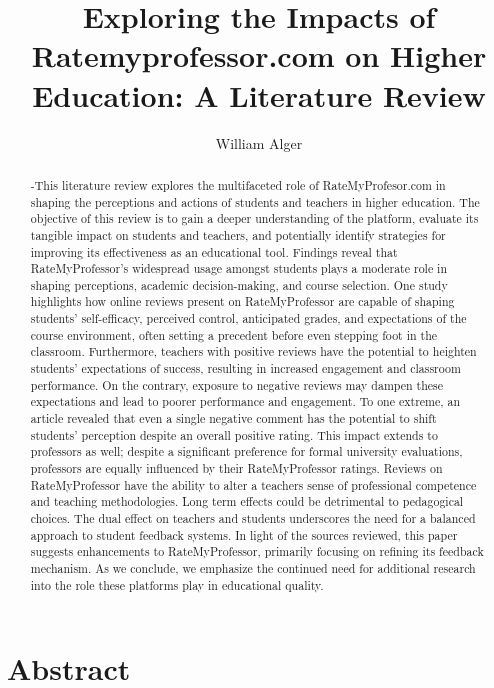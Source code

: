 \documentclass[man, 12pt]{apa7}
\title{Exploring the Impacts of Ratemyprofessor.com on Higher Education: A Literature Review}
\author{William Alger}
\affiliation{Northern Kentucky University}
\begin{document}
\maketitle

\section{Abstract}
\begin{abstract}
-This literature review explores the multifaceted role of RateMyProfesor.com in shaping the perceptions and actions of students and teachers in higher education. 
The objective of this review is to gain a deeper understanding of the platform, evaluate its tangible impact on students and teachers, and potentially identify strategies for improving its effectiveness as an educational tool. Findings reveal that RateMyProfessor's widespread usage amongst students plays a moderate role in shaping perceptions, academic decision-making, and course selection. One study highlights how online reviews present on RateMyProfessor are capable of shaping students' self-efficacy, perceived control, anticipated grades, and expectations of the course environment, often setting a precedent before even stepping foot in the classroom. Furthermore, teachers with positive reviews have the potential to heighten students' expectations of success, resulting in increased engagement and classroom performance. On the contrary, exposure to negative reviews may dampen these expectations and lead to poorer performance and engagement. To one extreme, an article revealed that even a single negative comment has the potential to shift students' perception despite an overall positive rating. This impact extends to professors as well; despite a significant preference for formal university evaluations, professors are equally influenced by their RateMyProfessor ratings. Reviews on RateMyProfessor have the ability to alter a teachers sense of professional competence and teaching methodologies. Long term effects could be detrimental to pedagogical choices. The dual effect on teachers and students underscores the need for a balanced approach to student feedback systems. In light of the sources reviewed, this paper suggests enhancements to RateMyProfessor, primarily focusing on refining its feedback mechanism. As we conclude, we emphasize the continued need for additional research into the role these platforms play in educational quality.
\end{abstract}


\end{document}
